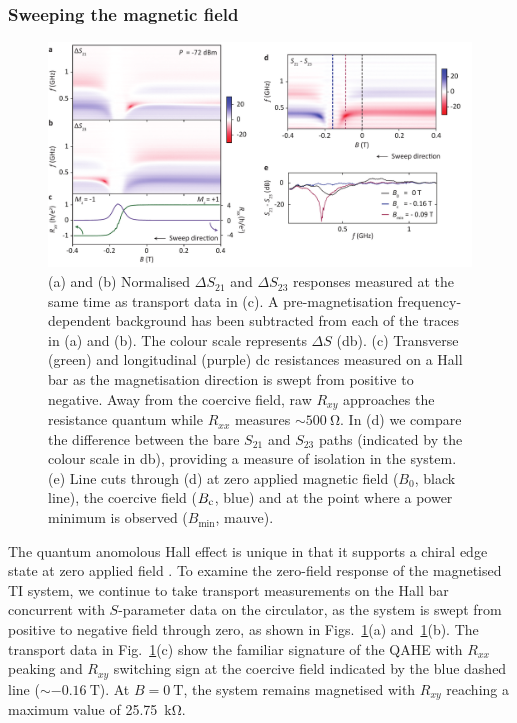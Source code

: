 \subsubsection{Sweeping the magnetic field}
\begin{figure}
\includegraphics[width=\linewidth]{Fig3_TI}
\caption[RF and DC response with magnetic field]{\label{fig:fig3_ti}(a) and (b) Normalised $\Delta S_{21}$ and $\Delta S_{23}$ responses measured at the same time as transport data in (c). A pre-magnetisation frequency-dependent background has been subtracted from each of the traces in (a) and (b). The colour scale represents $\Delta S$ (\si{\decibel}).  (c) Transverse (green) and longitudinal (purple) dc resistances measured on a Hall bar as the magnetisation direction is swept from positive to negative. Away from the coercive field, raw $R_{xy}$ approaches the resistance quantum while $R_{xx}$ measures $\sim \SI{500}{\ohm}$. In (d) we compare the difference between the bare $S_{21}$ and $S_{23}$ paths (indicated by the colour scale in \si{\decibel}), providing a measure of isolation in the system. (e) Line cuts through (d) at zero applied magnetic field ($B_0$, black line), the coercive field ($B_{\textrm c}$, blue) and at the point where a power minimum is observed ($B_{\textrm{min}}$, mauve).}
\end{figure}
The quantum anomolous Hall effect is unique in that it supports a chiral edge state at zero applied field \cite{bestwick2015precise}. To examine the zero-field response of the magnetised TI system, we continue to take transport measurements on the Hall bar concurrent with $S$-parameter data on the circulator, as the system is swept from positive to negative field through zero, as shown in Figs.~\ref{fig:fig3_ti}(a) and~\ref{fig:fig3_ti}(b). The transport data in Fig.~\ref{fig:fig3_ti}(c) show the familiar signature of the QAHE with $R_{xx}$ peaking and $R_{xy}$ switching sign at the coercive field indicated by the blue dashed line ($\sim \SI{-0.16}{\tesla}$). At $B = \SI{0}{\tesla}$, the system remains magnetised with $R_{xy}$ reaching a maximum value of \SI{25.75}{\kilo\ohm}.

